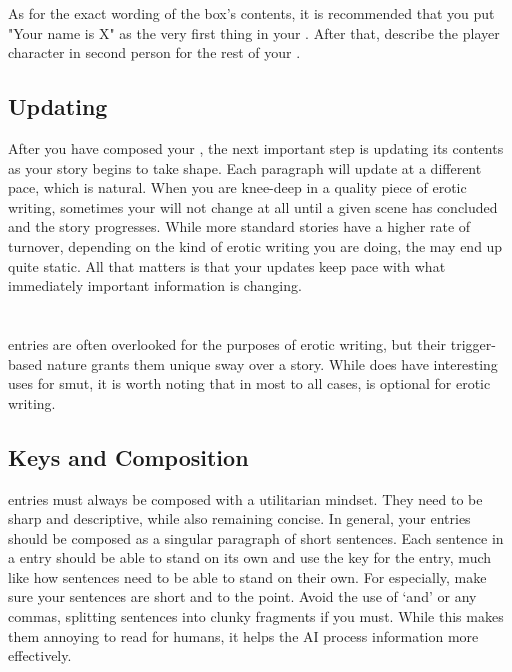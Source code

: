 ﻿\documentclass[Coomer-main.tex]{subfiles}
\begin{document}
As for the exact wording of the \rem box's contents, it is recommended that you put "Your name is X" as the very first thing in your \rem.
After that, describe the player character in second person for the rest of your \rem.

\section{Updating}

After you have composed your \rem, the next important step is updating its contents as your story begins to take shape.
Each paragraph will update at a different pace, which is natural.
When you are knee-deep in a quality piece of erotic writing, sometimes your \rem will not change at all until a given scene has concluded and the story progresses.
While more standard stories have a higher rate of \rem turnover, depending on the kind of erotic writing you are doing, the \rem may end up quite static.
All that matters is that your updates keep pace with what immediately important information is changing.

\chapter{\wi}
\label{ch:wi}

\wi entries are often overlooked for the purposes of erotic writing, but their trigger-based nature grants them unique sway over a story.
While \wi does have interesting uses for smut, it is worth noting that in most to all cases, \wi is optional for erotic writing.

\section{Keys and Composition}

\wi entries must always be composed with a utilitarian mindset.
They need to be sharp and descriptive, while also remaining concise.
In general, your entries should be composed as a singular paragraph of short sentences.
Each sentence in a \wi entry should be able to stand on its own and use the key for the entry, much like how \rem sentences need to be able to stand on their own.
For \wi especially, make sure your sentences are short and to the point.
Avoid the use of ‘and’ or any commas, splitting sentences into clunky fragments if you must.
While this makes them annoying to read for humans, it helps the AI process information more effectively.
\end{document}
